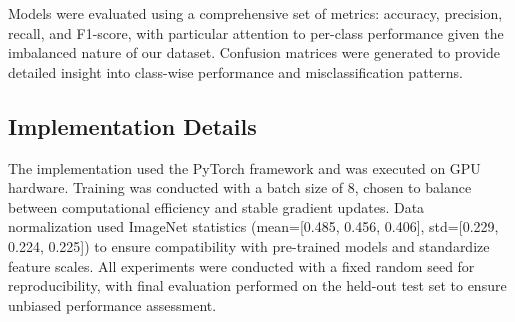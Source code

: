 Models were evaluated using a comprehensive set of metrics: accuracy, precision, recall, and F1-score, with particular attention to per-class performance given the imbalanced nature of our dataset. Confusion matrices were generated to provide detailed insight into class-wise performance and misclassification patterns.

\subsection{Implementation Details}
The implementation used the PyTorch framework and was executed on GPU hardware. Training was conducted with a batch size of 8, chosen to balance between computational efficiency and stable gradient updates. Data normalization used ImageNet statistics (mean=[0.485, 0.456, 0.406], std=[0.229, 0.224, 0.225]) to ensure compatibility with pre-trained models and standardize feature scales. All experiments were conducted with a fixed random seed for reproducibility, with final evaluation performed on the held-out test set to ensure unbiased performance assessment.